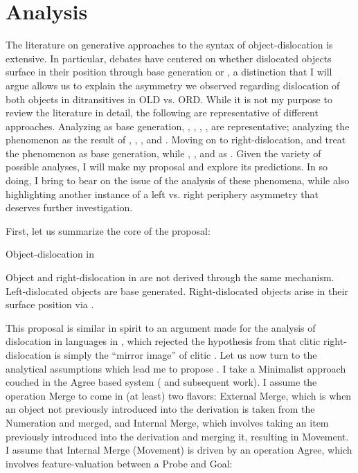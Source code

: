 \documentclass[output=paper
,newtxmath
,modfonts
,nonflat]{langsci/langscibook}
\begin{document}
\section{Analysis}\label{sec:ranero:4}

The literature on generative approaches to the syntax of object-dislocation is extensive. In particular, debates have centered on whether dislocated objects surface in their position through base generation or , a distinction that I will argue allows us to explain the asymmetry we observed regarding dislocation of both objects in ditransitives in OLD vs. ORD. While it is not my purpose to review the literature in detail, the following are representative of different approaches. Analyzing  as base generation, \citet{Cinque1990}, \citet{iatridou1995}, \citet{Anagnostopoulou1994}, \citet{Suñer2006}, \citet{De2007} are representative; analyzing the phenomenon as the result of , \citet{kayne1994}, \citet{Zubizarreta1998}, and \citet{zeller2009}. Moving on to right-dislocation, \citet{kayne1994} and \citet{Cardinaletti2002} treat the phenomenon as base generation, while \citet{Kayne1995}, \citet{Cecchetto1999}, \citet{Zeller2015} and \citet{Samek-Lodovici2016} as . Given the variety of possible analyses, I will make my proposal and explore its predictions. In so doing, I bring  to bear on the issue of the analysis of these phenomena, while also highlighting another instance of a left vs. right periphery asymmetry that deserves further investigation.

First, let us summarize the core of the proposal:

\ea\label{ex:ranero:28}
Object-dislocation in  

\ea\label{ex:ranero:28a}
Object  and right-dislocation in  are not derived through the same mechanism.
\ex\label{ex:ranero:28b}
Left-dislocated objects are base generated.
\ex\label{ex:ranero:28c}
Right-dislocated objects arise in their surface position via .
\z
\z

This proposal is similar in spirit to an argument made for the analysis of dislocation in  languages in \citet{Cecchetto1999}, which rejected the hypothesis from \citet{Vallduví1992} that clitic right-dislocation is simply the “mirror image” of clitic . Let us now turn to the analytical assumptions which lead me to propose . I take a Minimalist approach couched in the Agree based system (\citealt{Chomsky2000} and subsequent work). I assume the operation Merge to come in (at least) two flavors: External Merge, which is when an object not previously introduced into the derivation is taken from the Numeration and merged, and Internal Merge, which involves taking an item previously introduced into the derivation and merging it, resulting in Movement. I assume that Internal Merge (Movement) is driven by an operation Agree, which involves feature-valuation between a Probe and Goal:
\end{document}
